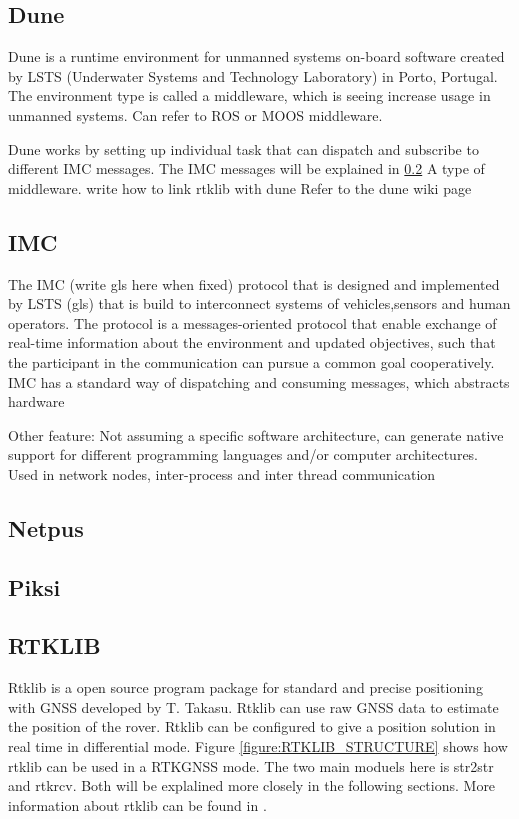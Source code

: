 \subsection{Dune}
Dune is a runtime environment for unmanned systems on-board software created by LSTS (Underwater Systems and Technology Laboratory) in Porto, Portugal. The environment type is called a middleware, which is seeing increase usage in unmanned systems. Can refer to ROS or MOOS middleware.

Dune works by setting up individual task that can dispatch and subscribe to different IMC messages. The IMC messages will be explained in \ref{ss:IMC}
A type of middleware. write how to link rtklib with dune
Refer to the dune wiki page
\subsection{IMC}\label{ss:IMC}
The IMC (write gls here when fixed) protocol that is designed and implemented by LSTS (gls) that is build to interconnect systems of vehicles,sensors and human operators. The protocol is a messages-oriented protocol that enable exchange of real-time information about the environment and updated objectives, such that the participant in the communication can pursue a common goal cooperatively.
IMC has a standard way of dispatching and consuming messages, which abstracts hardware

Other feature: Not assuming a specific software architecture, can generate native support for different programming languages and/or computer architectures. Used in network nodes, inter-process and inter thread communication
\subsection{Netpus}

\subsection{Piksi}\label{ss:Piksi}
\subsection{RTKLIB}\label{ss:Rtklib}
Rtklib is a open source program package for standard and precise positioning with GNSS developed by T. Takasu. Rtklib can use raw GNSS data to estimate the position of the rover. Rtklib can be configured to give a position solution in real time in differential mode. Figure \ref{figure:RTKLIB_STRUCTURE} shows how rtklib can be used in a RTKGNSS mode. The two main moduels here is str2str and rtkrcv. Both will be explalined more closely in the following sections. More information about  rtklib can be found in \citep{Rtklib242}.

